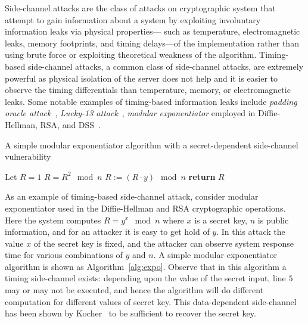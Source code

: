 Side-channel attacks are the class of attacks on cryptographic system that
attempt to gain information about a system by exploiting involuntary
information leaks via physical properties---
such as temperature, electromagnetic leaks, memory footprints, and timing
delays---of the implementation rather than using brute force or exploiting
theoretical weakness of the algorithm.
Timing-based side-channel attacks, a common class of
side-channel attacks, are extremely powerful as physical isolation of the
server does not help and it is easier to observe the timing differentials than
temperature, memory, or electromagnetic leaks.  
Some notable examples of timing-based information leaks include \emph{padding oracle
attack}~\cite{Vau02}, \emph{Lucky-13 attack}~\cite{al2013lucky},  \emph{modular
exponentiator} employed in Diffie-Hellman, RSA, and DSS~\cite{kocher96}.

\begin{algorithm}[t]
  \caption{A simple modular exponentiator algorithm with a secret-dependent side-channel vulnerability}
  \label{alg:expo}
  \begin{algorithmic}[1]
    \State  Let $R = 1$
    \State  $R = R^2 \mod n$
    \State  $R := (R \cdot y) \mod n$
    \EndIf
    \EndFor
    \State \textbf{return} $R$
  \end{algorithmic}
\end{algorithm}

As an example of timing-based side-channel attack, consider modular
exponentiator used in the Diffie-Hellman and RSA cryptographic operations.
Here the system computes $R = y^x \mod n$ where $x$ is a secret key, $n$ is
public information, and for an attacker it is easy to get hold of $y$.
In this attack the value $x$ of the secret key is fixed, and the attacker can
observe system response time for various combinations of $y$ and $n$.
A simple modular exponentiator algorithm is shown as Algorithm~\ref{alg:expo}.
Observe that in this algorithm a timing side-channel exists: depending upon
the value of the secret input, line $5$ may or may not be executed, and hence
the algorithm will do different computation for different values of secret key.
This data-dependent side-channel has been shown by Kocher~\cite{kocher96} to be sufficient to recover the secret key.

